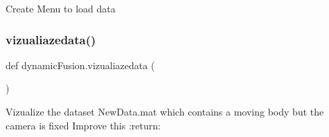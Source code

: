 \begin{DoxyVerb}Create Menu to load data \end{DoxyVerb}
 \mbox{\label{namespacedynamic_fusion_a10b565077b2ce16f2ca380fb8b634fa1}} 
\subsubsection{vizualiazedata()}
{\footnotesize\ttfamily def dynamic\+Fusion.\+vizualiazedata (\begin{DoxyParamCaption}{ }\end{DoxyParamCaption})}

\begin{DoxyVerb}Vizualize the dataset NewData.mat which contains a moving body but the camera is fixed
Improve this
:return:
\end{DoxyVerb}
 